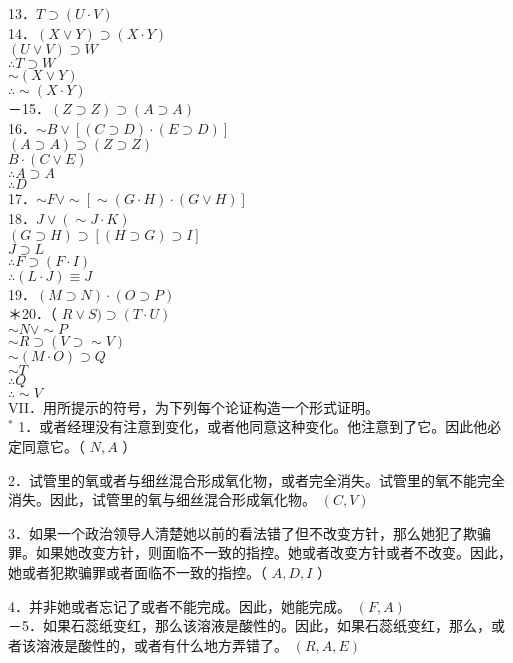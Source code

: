13．$T \supset(U \cdot V)$\\
14．$(X \vee Y) \supset(X \cdot Y)$\\
$(U \vee V) \supset W$\\
$\therefore T \supset W$\\
$\sim(X \vee Y)$\\
$\therefore \sim(X \cdot Y)$\\
－15．$(Z \supset Z) \supset(A \supset A)$\\
16．$\sim B \vee[(C \supset D) \cdot(E \supset D)]$\\
$(A \supset A) \supset(Z \supset Z)$\\
$B \cdot(C \vee E)$\\
$\therefore A \supset A$\\
$\therefore D$\\
17．$\sim F \vee \sim[\sim(G \cdot H) \cdot(G \vee H)]$\\
18．$J \vee(\sim J \cdot K)$\\
$(G \supset H) \supset[(H \supset G) \supset I]$\\
$J \supset L$\\
$\therefore F \supset(F \cdot I)$\\
$\therefore(L \cdot J) \equiv J$\\
19．$(M \supset N) \cdot(O \supset P)$\\
＊20．（ $R \vee S) \supset(T \cdot U)$\\
$\sim N \vee \sim P$\\
$\sim R \supset(V \supset \sim V)$\\
$\sim(M \cdot O) \supset Q$\\
$\sim T$\\
$\therefore Q$\\
$\therefore \sim V$\\
VII．用所提示的符号，为下列每个论证构造一个形式证明。\\
${ }^{*}$ 1．或者经理没有注意到变化，或者他同意这种变化。他注意到了它。因此他必定同意它。（ $N, A$ ）

2．试管里的氧或者与细丝混合形成氧化物，或者完全消失。试管里的氧不能完全消失。因此，试管里的氧与细丝混合形成氧化物。 $(C, V)$

3．如果一个政治领导人清楚她以前的看法错了但不改变方针，那么她犯了欺骗罪。如果她改变方针，则面临不一致的指控。她或者改变方针或者不改变。因此，她或者犯欺骗罪或者面临不一致的指控。（ $A, D, I$ ）

4．并非她或者忘记了或者不能完成。因此，她能完成。 $(F, A)$\\
－5．如果石蕊纸变红，那么该溶液是酸性的。因此，如果石蕊纸变红，那么，或者该溶液是酸性的，或者有什么地方弄错了。 $(R, A, E)$

